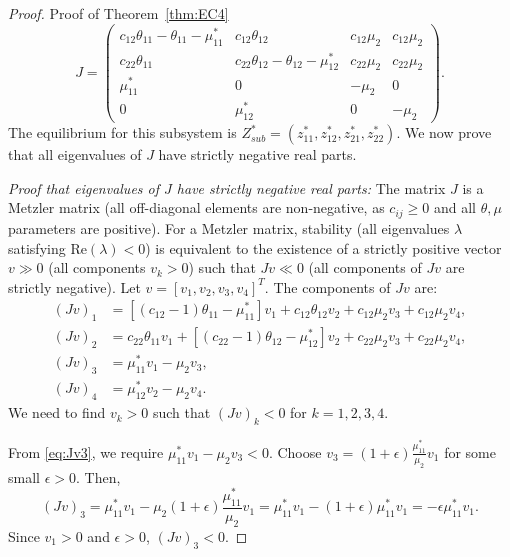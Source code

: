 \begin{proof}{Proof of Theorem~\ref{thm:EC4}}
\begin{equation*}
  J = \begin{pmatrix}
  c_{12}\theta_{11} - \theta_{11} - \mu_{11}^{*} & c_{12}\theta_{12} & c_{12}\mu_{2} & c_{12}\mu_{2} \\
  c_{22}\theta_{11} & c_{22}\theta_{12} - \theta_{12} - \mu_{12}^{*} & c_{22}\mu_{2} & c_{22}\mu_{2} \\
  \mu_{11}^{*} & 0 & -\mu_{2} & 0 \\
  0 & \mu_{12}^{*} & 0 & -\mu_{2}
  \end{pmatrix}.
\end{equation*}
The equilibrium for this subsystem is $Z_{sub}^* = (z_{11}^*, z_{12}^*, z_{21}^*, z_{22}^*)$.
We now prove that all eigenvalues of $J$ have strictly negative real parts.

\textit{Proof that eigenvalues of $J$ have strictly negative real parts:}
The matrix $J$ is a Metzler matrix (all off-diagonal elements are non-negative, as $c_{ij} \ge 0$ and all $\theta, \mu$ parameters are positive).
For a Metzler matrix, stability (all eigenvalues $\lambda$ satisfying $\text{Re}(\lambda) < 0$) is equivalent to the existence of a strictly positive vector $v \gg 0$ (all components $v_k > 0$) such that $Jv \ll 0$ (all components of $Jv$ are strictly negative).
Let $v = [v_1, v_2, v_3, v_4]^T$. The components of $Jv$ are:
\begin{align}
(Jv)_1 &= [(c_{12}-1)\theta_{11} - \mu_{11}^{*}]v_1 + c_{12}\theta_{12}v_2 + c_{12}\mu_{2}v_3 + c_{12}\mu_{2}v_4 \label{eq:Jv1}, \\
(Jv)_2 &= c_{22}\theta_{11}v_1 + [(c_{22}-1)\theta_{12} - \mu_{12}^{*}]v_2 + c_{22}\mu_{2}v_3 + c_{22}\mu_{2}v_4 \label{eq:Jv2}, \\
(Jv)_3 &= \mu_{11}^{*}v_1 - \mu_{2}v_3 \label{eq:Jv3}, \\
(Jv)_4 &= \mu_{12}^{*}v_2 - \mu_{2}v_4 \label{eq:Jv4}.
\end{align}
We need to find $v_k > 0$ such that $(Jv)_k < 0$ for $k=1,2,3,4$.

From \eqref{eq:Jv3}, we require $\mu_{11}^{*}v_1 - \mu_{2}v_3 < 0$. Choose $v_3 = (1+\epsilon)\frac{\mu_{11}^{*}}{\mu_{2}}v_1$ for some small $\epsilon > 0$. Then,
\begin{equation*}
  (Jv)_3 = \mu_{11}^{*}v_1 - \mu_{2}(1+\epsilon)\frac{\mu_{11}^{*}}{\mu_{2}}v_1 = \mu_{11}^{*}v_1 - (1+\epsilon)\mu_{11}^{*}v_1 = -\epsilon\mu_{11}^{*}v_1.
\end{equation*}
Since $v_1 > 0$ and $\epsilon > 0$, $(Jv)_3 < 0$.


\end{proof}
